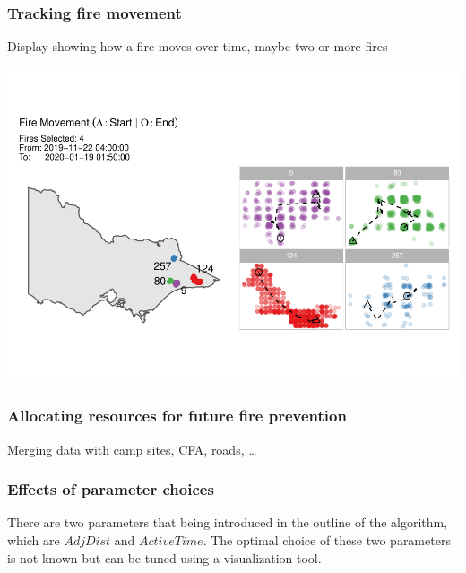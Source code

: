 \hypertarget{tracking-fire-movement}{%
\subsubsection{Tracking fire movement}\label{tracking-fire-movement}}

Display showing how a fire moves over time, maybe two or more fires

\begin{Schunk}


\begin{center}\includegraphics[width=0.8\linewidth]{clustering_paper_files/figure-latex/unnamed-chunk-15-1} \end{center}

\end{Schunk}

\hypertarget{allocating-resources-for-future-fire-prevention}{%
\subsubsection{Allocating resources for future fire
prevention}\label{allocating-resources-for-future-fire-prevention}}

Merging data with camp sites, CFA, roads, \ldots{}

\hypertarget{effects-of-parameter-choices}{%
\subsubsection{Effects of parameter
choices}\label{effects-of-parameter-choices}}

There are two parameters that being introduced in the outline of the
algorithm, which are \(AdjDist\) and \(ActiveTime\). The optimal choice
of these two parameters is not known but can be tuned using a
visualization tool.

